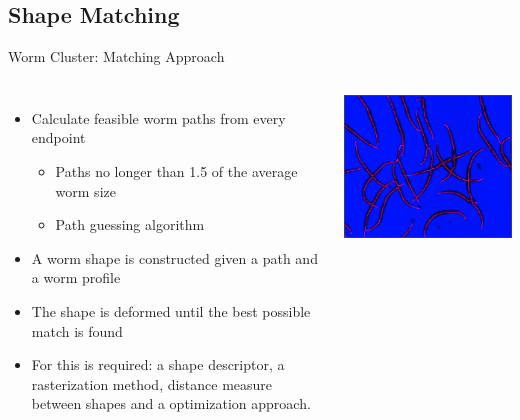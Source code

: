 \documentclass[xcolor=table]{beamer}
\begin{document}
\subsection{Shape Matching}
\begin{frame}{Worm Cluster: Matching Approach}

\begin{columns}[c]
\column{2.6in}
\begin{itemize}
\item Calculate feasible worm paths from every endpoint
  \begin{itemize}
  \item Paths no longer than 1.5 of the average worm size
  \item Path guessing algorithm 
  \end{itemize}
\pause\item A worm shape is constructed given a path and a worm
  profile \pause
\item The shape is deformed until the best possible match is
  found \pause
\item For this is required: a shape descriptor, a
  rasterization method, distance measure between shapes
  and a optimization approach.
\end{itemize}
\column{2.2in}
\includegraphics[scale=0.3]{clusterskeleton}
\end{columns}

\end{frame}


\end{document}
